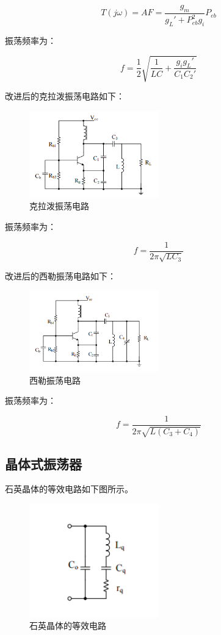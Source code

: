 \documentclass{../source/Experiment}
\begin{document}
$$
    T(j\omega) = AF = \frac{g_m}{g_L' + P_{eb}^2g_i}P_{eb}
$$

振荡频率为：

$$
    f = \frac{1}{2}\sqrt{\frac{1}{LC} + \frac{g_ig_L'}{C_1C_2'}}
$$

改进后的克拉泼振荡电路如下：
\begin{figure}[H]
    \centering
    \includegraphics[width = 0.5\textwidth]{lab3/4.png}
    \caption{克拉泼振荡电路}
\end{figure}
振荡频率为：

$$
    f = \frac{1}{2\pi\sqrt{LC_3}}
$$

改进后的西勒振荡电路如下：
\begin{figure}[H]
    \centering
    \includegraphics[width = 0.5\textwidth]{lab3/5.png}
    \caption{西勒振荡电路}
\end{figure}
振荡频率为：

$$
    f = \frac{1}{2\pi\sqrt{L(C_3+C_4)}}
$$


\subsection{晶体式振荡器}
石英晶体的等效电路如下图所示。
\begin{figure}[H]
    \centering
    \includegraphics[width = 0.5\textwidth]{lab3/6.png}
    \caption{石英晶体的等效电路}
\end{figure}
\end{document}
